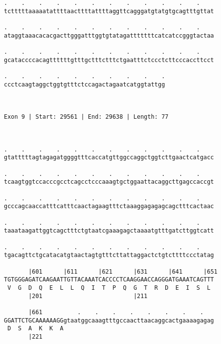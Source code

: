 \documentclass{article}
\begin{document}
\begin{Verbatim}
.    .    .    .    .    .    .    .    .    .    .    .    
tctttttaaaaatattttaacttttattttaggttcagggatgtatgtgcagtttgttat
                                                            
.    .    .    .    .    .    .    .    .    .    .    .    
ataggtaaacacacgacttgggatttggtgtatagatttttttcatcatccgggtactaa
                                                            
.    .    .    .    .    .    .    .    .    .    .    .    
gcataccccacagttttttgtttgctttctttctgaatttctccctcttcccaccttcct
                                                            
.    .    .    .    .    .    .    .    .    .
ccctcaagtaggctggtgtttctccagactagaatcatggtattgg
                                              
                                              
 
Exon 9 | Start: 29561 | End: 29638 | Length: 77



.    .    .    .    .    .    .    .    .    .    .    .    
gtatttttagtagagatggggtttcaccatgttggccaggctggtcttgaactcatgacc
                                                            
.    .    .    .    .    .    .    .    .    .    .    .    
tcaagtggtccacccgcctcagcctcccaaagtgctggaattacaggcttgagccaccgt
                                                            
.    .    .    .    .    .    .    .    .    .    .    .    
gcccagcaaccatttcatttcaactagaagtttctaaaggagagagcagctttcactaac
                                                            
.    .    .    .    .    .    .    .    .    .    .    .    
taaataagattggtcagctttctgtaatcgaaagagctaaaatgtttgatcttggtcatt
                                                            
.    .    .    .    .    .    .    .    .    .    .    .    
tgacagttctgcatacatgtaactagtgtttcttattaggactctgtcttttccctatag
                                                            
       |601      |611      |621      |631      |641      |651
TGTGGGAGATCAAGAATTGTTACAAATCACCCCTCAAGGAACCAGGGATGAAATCAGTTT
 V  G  D  Q  E  L  L  Q  I  T  P  Q  G  T  R  D  E  I  S  L 
       |201                          |211                   
  
       |661          .    .    .    .    .    .    .    .   
GGATTCTGCAAAAAAGGgtaatggcaaagtttgccaacttaacaggcactgaaaagagag
 D  S  A  K  K  A                                           
       |221                                                 
  

\end{Verbatim}
\end{document}
